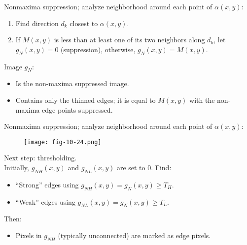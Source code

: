 \begin{frame}
Nonmaxima suppression; analyze neighborhood around each point of $\alpha(x,y)$:
\begin{enumerate}
\item Find direction $d_{k}$ closest to $\alpha(x,y)$.
\item If $M(x,y)$ is less than at least one of its two neighbors along $d_{k}$, let $g_{N}(x,y)=0$ (suppression), otherwise, $g_{N}(x,y) = M(x,y)$.
\end{enumerate}
Image $g_{N}$:
\begin{itemize}
\item Is the non-maxima suppressed image.
\item Contains only the thinned edges; it is equal to $M(x,y)$ with the non-maxima edge points suppressed.
\end{itemize}
\end{frame}

\begin{frame}
Nonmaxima suppression; analyze neighborhood around each point of $\alpha(x,y)$:
\begin{figure}[!h]
\texttt{[image: fig-10-24.png]}
\end{figure}
\end{frame}

\begin{frame}
Next step: thresholding.\\
Initially, $g_{NH}(x,y)$ and $g_{NL}(x,y)$ are set to $0$.
Find:
\begin{itemize}
\item ``Strong'' edges using $g_{NH}(x,y) = g_{N}(x,y) \geq T_{H}$.
\item ``Weak'' edges using $g_{NL}(x,y) = g_{N}(x,y) \geq T_{L}$.
\end{itemize}
Then:
\begin{itemize}
\item Pixels in $g_{NH}$ (typically unconnected) are marked as edge pixels.
\end{itemize}
\end{frame}

